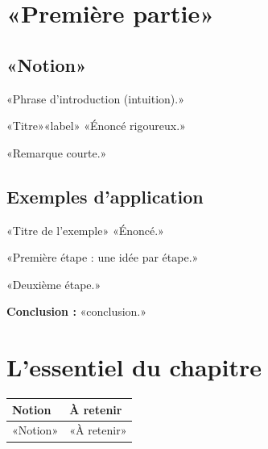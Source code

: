 \documentclass[11pt,a4paper]{article}
\begin{document}
\section{«Première partie»}

\subsection{«Notion»}

«Phrase d'introduction (intuition).»

\begin{definition}{«Titre»}{«label»}
«Énoncé rigoureux.»
\end{definition}

\begin{remarque}
«Remarque courte.»
\end{remarque}

\subsection{Exemples d'application}

\begin{exemple}{«Titre de l'exemple»}{}
«Énoncé.»
\begin{etapes}
  \item «Première étape : une idée par étape.»
  \item «Deuxième étape.»
\end{etapes}
\textbf{Conclusion :} «conclusion.»
\end{exemple}

\section*{L'essentiel du chapitre}

\begin{center}
\renewcommand{\arraystretch}{1.5}
\begin{tabular}{|>{\raggedright\arraybackslash}m{4.2cm}|>{\raggedright\arraybackslash}m{11.6cm}|}
\hline
\rowcolor{bleuclair}\textbf{Notion} & \textbf{À retenir} \\ \hline
«Notion» & «À retenir» \\ \hline
\end{tabular}
\end{center}
\end{document}
